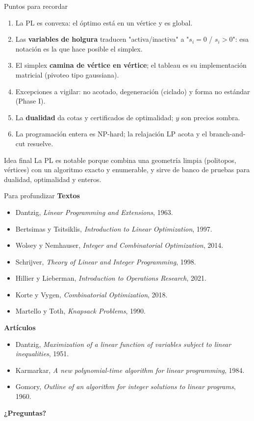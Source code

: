 \documentclass[10pt,aspectratio=169]{beamer}
\begin{document}
\begin{frame}{Puntos para recordar}
  \small
  \begin{enumerate}
    \item La PL es convexa: el óptimo está en un vértice y es global.
    \item Las \textbf{variables de holgura} traducen "activa/inactiva" a "$s_i=0$ /
      $s_i>0$": esa notación es la que hace posible el simplex.
    \item El simplex \textbf{camina de vértice en vértice}; el tableau es su
      implementación matricial (pivoteo tipo gaussiana).
    \item Excepciones a vigilar: no acotado, degeneración (ciclado) y forma no
      estándar (Phase I).
    \item La \textbf{dualidad} da cotas y certificados de optimalidad; $y$ son
      precios sombra.
    \item La programación entera es NP-hard; la relajación LP acota y el
      branch-and-cut resuelve.
  \end{enumerate}
  \vfill
  \begin{alertblock}{Idea final}
    La PL es notable porque combina una geometría limpia (politopos, vértices)
    con un algoritmo exacto y enumerable, y sirve de banco de pruebas para
    dualidad, optimalidad y enteros.
  \end{alertblock}
\end{frame}

\begin{frame}{Para profundizar}
  \small
  \textbf{Textos}
  \begin{itemize}
    \item Dantzig, \emph{Linear Programming and Extensions}, 1963.
    \item Bertsimas y Tsitsiklis, \emph{Introduction to Linear Optimization}, 1997.
    \item Wolsey y Nemhauser, \emph{Integer and Combinatorial Optimization}, 2014.
    \item Schrijver, \emph{Theory of Linear and Integer Programming}, 1998.
    \item Hillier y Lieberman, \emph{Introduction to Operations Research}, 2021.
    \item Korte y Vygen, \emph{Combinatorial Optimization}, 2018.
    \item Martello y Toth, \emph{Knapsack Problems}, 1990.
  \end{itemize}
  \textbf{Artículos}
  \begin{itemize}
    \item Dantzig, \emph{Maximization of a linear function of variables subject to
      linear inequalities}, 1951.
    \item Karmarkar, \emph{A new polynomial-time algorithm for linear programming}, 1984.
    \item Gomory, \emph{Outline of an algorithm for integer solutions to linear
      programs}, 1960.
  \end{itemize}
  \vfill
  \begin{center}
    \large\textbf{¿Preguntas?}
  \end{center}
\end{frame}
\end{document}
